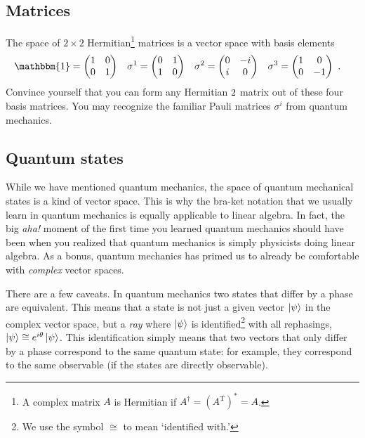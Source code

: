 \documentclass[
  11pt,
	colorful,
	raggedright,
]{tufte-style-thesis-flip}
\begin{document}
\subsection{Matrices}
  The space of $2\times 2$ Hermitian\footnote{A complex matrix $A$ is Hermitian if $A^\dag = (A^\text{T})^* = A$.} matrices is a vector space with basis elements
 \begin{align}
   \mathbbm{1} &= 
   \begin{pmatrix}
     1 & 0 \\
     0 & 1 
   \end{pmatrix}
   &
   \sigma^1 &= 
   \begin{pmatrix}
     0 & 1 \\
     1 & 0 
   \end{pmatrix}
   &
   \sigma^2 &= 
   \begin{pmatrix}
     0 & -i \\
     i &  0
   \end{pmatrix}
   &
   \sigma^3 &= 
   \begin{pmatrix}
     1 & 0 \\
     0 & -1 
   \end{pmatrix} \ .
 \end{align}
 Convince yourself that you can form any Hermitian $2\time 2$ matrix out of these four basis matrices. You may recognize the familiar Pauli matrices $\sigma^i$ from quantum mechanics. 

\subsection{Quantum states}

While we have mentioned quantum mechanics, the space of quantum mechanical states is a kind of vector space. This is why the bra-ket notation that we usually learn in quantum mechanics is equally applicable to linear algebra. In fact, the big \emph{aha!} moment of the first time you learned quantum mechanics should have been when you realized that quantum mechanics is simply physicists doing linear algebra. As a bonus, quantum mechanics has primed us to already be comfortable with \emph{complex} vector spaces.

There are a few caveats. In quantum mechanics two states that differ by a phase are equivalent. This means that a state is not just a given vector $\left|\psi\right\rangle$ in the complex vector space, but a \emph{ray} where $\left|\psi\right\rangle$ is identified\footnote{We use the symbol $\cong$ to mean `identified with.'} with all rephasings, $\left|\psi\right\rangle \cong e^{i\theta}\left|\psi\right\rangle$. This identification simply means that two vectors that only differ by a phase correspond to the same quantum state: for example, they correspond to the same observable (if the states are directly observable).
\end{document}
